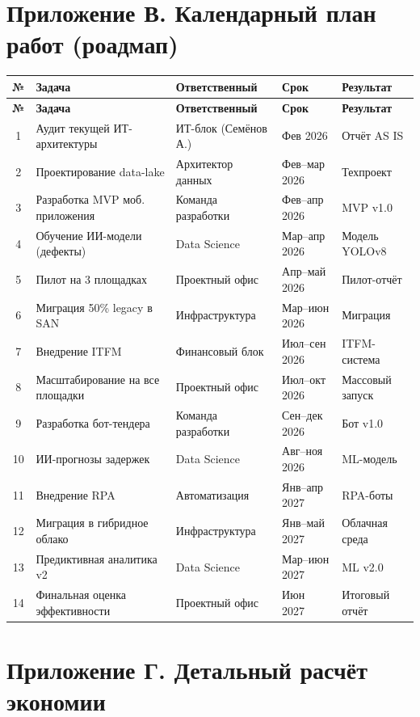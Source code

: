 \documentclass[12pt,a4paper]{article}
\begin{document}
\section{Приложение В. Календарный план работ (роадмап)}

\begin{longtable}{|c|p{40mm}|p{30mm}|p{25mm}|p{30mm}|}
\hline
\rowcolor{samoletlight}
\textbf{№} & \textbf{Задача} & \textbf{Ответственный} & \textbf{Срок} & \textbf{Результат} \\
\hline
\endfirsthead
\hline
\rowcolor{samoletlight}
\textbf{№} & \textbf{Задача} & \textbf{Ответственный} & \textbf{Срок} & \textbf{Результат} \\
\hline
\endhead
1 & Аудит текущей ИТ-архитектуры & ИТ-блок (Семёнов А.) & Фев 2026 & Отчёт AS IS \\
\hline
2 & Проектирование data-lake & Архитектор данных & Фев--мар 2026 & Техпроект \\
\hline
3 & Разработка MVP моб. приложения & Команда разработки & Фев--апр 2026 & MVP v1.0 \\
\hline
4 & Обучение ИИ-модели (дефекты) & Data Science & Мар--апр 2026 & Модель YOLOv8 \\
\hline
5 & Пилот на 3 площадках & Проектный офис & Апр--май 2026 & Пилот-отчёт \\
\hline
6 & Миграция 50\% legacy в SAN & Инфраструктура & Мар--июн 2026 & Миграция \\
\hline
7 & Внедрение ITFM & Финансовый блок & Июл--сен 2026 & ITFM-система \\
\hline
8 & Масштабирование на все площадки & Проектный офис & Июл--окт 2026 & Массовый запуск \\
\hline
9 & Разработка бот-тендера & Команда разработки & Сен--дек 2026 & Бот v1.0 \\
\hline
10 & ИИ-прогнозы задержек & Data Science & Авг--ноя 2026 & ML-модель \\
\hline
11 & Внедрение RPA & Автоматизация & Янв--апр 2027 & RPA-боты \\
\hline
12 & Миграция в гибридное облако & Инфраструктура & Янв--май 2027 & Облачная среда \\
\hline
13 & Предиктивная аналитика v2 & Data Science & Мар--июн 2027 & ML v2.0 \\
\hline
14 & Финальная оценка эффективности & Проектный офис & Июн 2027 & Итоговый отчёт \\
\hline
\end{longtable}

\section{Приложение Г. Детальный расчёт экономии}
\end{document}
